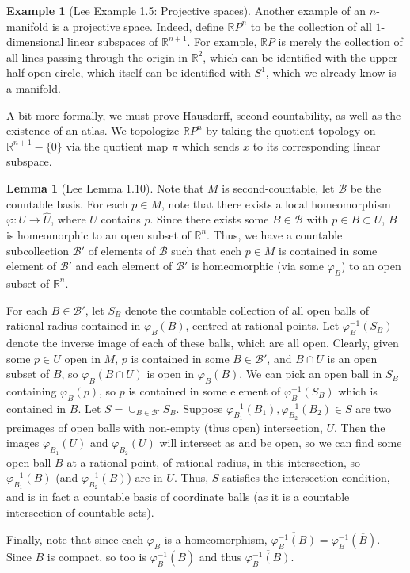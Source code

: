 \documentclass[aps,pra,showpacs,notitlepage,onecolumn,superscriptaddress,nofootinbib]{revtex4-1}
\theoremstyle{definition}
\newtheorem{lemma}{Lemma}[section]
\newtheorem{example}{Example}[section]
\begin{document}
\begin{example}[Lee Example 1.5: Projective spaces]

Another example of an $n$-manifold is a projective space. Indeed, define $\mathbb{R} P^{n}$ to be the collection of all $1$-dimensional linear subspaces of $\mathbb{R}^{n + 1}$. For example, $\mathbb{R}P$ is merely the collection
of all lines passing through the origin in $\mathbb{R}^2$, which can be identified with the upper half-open circle, which itself can be identified with $S^1$, which we already know is a manifold.

A bit more formally, we must prove Hausdorff, second-countability, as well as the existence of an atlas. We topologize $\mathbb{R}P^{n}$ by taking the quotient topology on $\mathbb{R}^{n + 1} - \{0\}$ via the quotient map $\pi$ which
sends $x$ to its corresponding linear subspace.
\end{example}

\begin{lemma}[Lee Lemma 1.10]
Note that $M$ is second-countable, let $\mathcal{B}$ be the countable basis. For each $p \in M$, note that there exists a local homeomorphism $\varphi : U \rightarrow \widehat{U}$, where $U$
contains $p$. Since there exists some $B \in \mathcal{B}$ with $p \in B \subset U$, $B$ is homeomorphic to an open subset of $\mathbb{R}^{n}$. Thus, we have a countable subcollection $\mathcal{B}'$ of elements of $\mathcal{B}$
such that each $p \in M$ is contained in some element of $\mathcal{B}'$ and each element of $\mathcal{B}'$ is homeomorphic (via some $\varphi_B$) to an open subset of $\mathbb{R}^{n}$.

For each $B \in \mathcal{B}'$, let $S_B$ denote the countable collection of all open balls of rational radius contained in $\varphi_B(B)$, centred at rational points. Let $\varphi_B^{-1}(S_B)$ denote the inverse image of
each of these balls, which are all open. Clearly, given some $p \in U$ open in $M$, $p$ is contained in some $B \in \mathcal{B}'$, and $B \cap U$ is an open subset of $B$, so $\varphi_B(B \cap U)$ is open in $\varphi_B(B)$.
We can pick an open ball in $S_B$ containing $\varphi_B(p)$, so $p$ is contained in some element of $\varphi_B^{-1}(S_B)$ which is contained in $B$. Let $S = \cup_{B \in \mathcal{B}'} S_B$. Suppose $\varphi_{B_1}^{-1}(B_1), \varphi_{B_2}^{-1}(B_2) \in S$ are two preimages of open balls with non-empty (thus open) intersection, $U$. Then the images $\varphi_{B_1}(U)$ and $\varphi_{B_2}(U)$ will intersect as and be open, so we can find some open ball $B$ at a rational point, of rational radius, in this intersection, so $\varphi_{B_1}^{-1}(B)$ (and $\varphi_{B_2}^{-1}(B)$) are in $U$. Thus, $S$ satisfies the intersection condition, and is in fact a countable basis of coordinate balls (as it is a countable intersection of countable sets).

Finally, note that since each $\varphi_B$ is a homeomorphism, $\overline{\varphi^{-1}_B(B)} = \varphi^{-1}_B(\overline{B})$. Since $\overline{B}$ is compact, so too is $\varphi^{-1}_B(\overline{B})$ and thus $\overline{\varphi^{-1}_B(B)}$.
\end{lemma}
\end{document}
